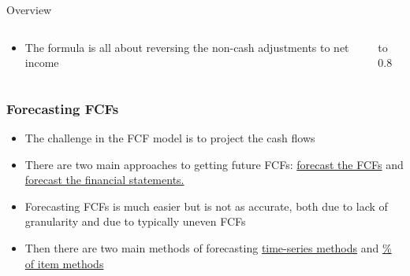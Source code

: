 \documentclass[handout, 11pt]{beamer}
\begin{document}
\begin{section}{Overview}
\begin{frame}
\begin{columns}
\begin{column}{0.5\textwidth}
{\begin{itemize}
\vfill
\item The formula is all about reversing the non-cash adjustments to net income
\end{itemize}}
\end{column}
\begin{column}{0.5\textwidth}
\vbox to 0.8
\end{column}
\end{columns}
\end{frame}
\begin{frame}
\frametitle{Forecasting FCFs}
\begin{itemize}
\item The challenge in the FCF model is to project the cash flows
\vfill
\item There are two main approaches to getting future FCFs:
\underline{forecast the FCFs}
and
\underline{forecast the financial statements.}
\vfill
\item Forecasting FCFs is much easier but is not as accurate, both due to lack of granularity and due to typically uneven FCFs
\vfill
\item Then there are two main methods of forecasting
\underline{time-series methods}
and
\underline{\% of item methods}
\end{itemize}
\end{frame}
\end{section}
\end{document}
